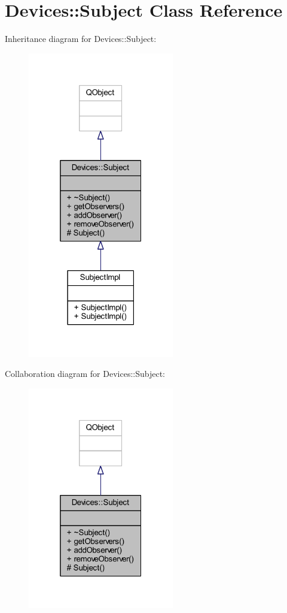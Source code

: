 \hypertarget{class_devices_1_1_subject}{}\section{Devices\+:\+:Subject Class Reference}
\label{class_devices_1_1_subject}


Inheritance diagram for Devices\+:\+:Subject\+:\nopagebreak
\begin{figure}[H]
\begin{center}
\leavevmode
\includegraphics[width=181pt]{dd/d45/class_devices_1_1_subject__inherit__graph}
\end{center}
\end{figure}


Collaboration diagram for Devices\+:\+:Subject\+:\nopagebreak
\begin{figure}[H]
\begin{center}
\leavevmode
\includegraphics[width=181pt]{dd/dbf/class_devices_1_1_subject__coll__graph}
\end{center}
\end{figure}
